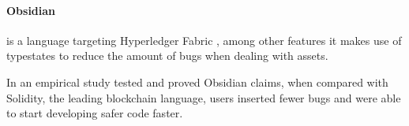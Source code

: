 \paragraph{Obsidian} is a language targeting Hyperledger Fabric \autocite{Fabric2021},
among other features it makes use of typestates to reduce the amount of bugs when dealing with assets.

In \autocite{Coblenz2020} an empirical study tested and proved Obsidian claims,
when compared with Solidity, the leading blockchain language,
users inserted fewer bugs and were able to start developing safer code faster.

